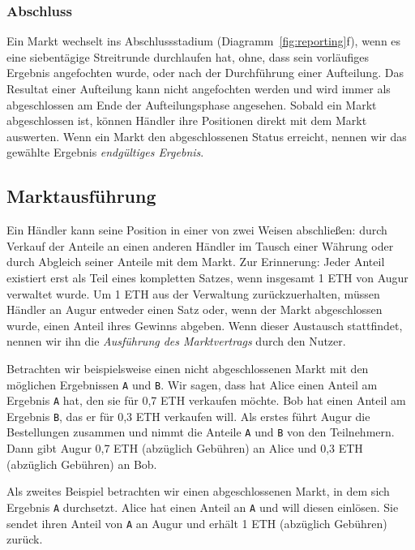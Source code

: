 \documentclass[floatfix,reprint,nofootinbib,amsmath,amssymb,epsfig,pre,floats,letterpaper,groupedaffiliation]{revtex4-1}
\theoremstyle{definition}
\theoremstyle{definition}
\theoremstyle{definition}
\begin{document}
\subsubsection{Abschluss}

Ein Markt wechselt ins Abschlussstadium (Diagramm~\ref{fig:reporting}f), wenn es eine siebentägige Streitrunde durchlaufen hat, ohne, dass sein vorläufiges Ergebnis angefochten wurde, oder nach der Durchführung einer Aufteilung. Das Resultat einer Aufteilung kann nicht angefochten werden und wird immer als abgeschlossen am Ende der Aufteilungsphase angesehen. Sobald ein Markt abgeschlossen ist, können Händler ihre Positionen direkt mit dem Markt auswerten. Wenn ein Markt den abgeschlossenen Status erreicht, nennen wir das gewählte Ergebnis \textit{endgültiges Ergebnis}.

\subsection{Marktausführung}\label{section:settlement}

Ein Händler kann seine Position in einer von zwei Weisen abschließen: durch Verkauf der Anteile an einen anderen Händler im Tausch einer Währung oder durch Abgleich seiner Anteile mit dem Markt. Zur Erinnerung: Jeder Anteil existiert erst als Teil eines kompletten Satzes, wenn insgesamt 1 ETH von Augur verwaltet wurde. Um 1 ETH aus der Verwaltung zurückzuerhalten, müssen Händler an Augur entweder einen Satz oder, wenn der Markt abgeschlossen wurde, einen Anteil ihres Gewinns abgeben. Wenn dieser Austausch stattfindet, nennen wir ihn die \textit{Ausführung des Marktvertrags} durch den Nutzer.

Betrachten wir beispielsweise einen nicht abgeschlossenen Markt mit den möglichen Ergebnissen \texttt{A} und \texttt{B}. Wir sagen, dass hat Alice einen Anteil am Ergebnis \texttt{A} hat, den sie für 0,7 ETH verkaufen möchte. Bob hat einen Anteil am Ergebnis \texttt{B}, das er für 0,3 ETH verkaufen will. Als erstes führt Augur die Bestellungen zusammen und nimmt die Anteile \texttt{A} und \texttt{B} von den Teilnehmern. Dann gibt Augur 0,7 ETH (abzüglich Gebühren) an Alice und 0,3 ETH (abzüglich Gebühren) an Bob.

Als zweites Beispiel betrachten wir einen abgeschlossenen Markt, in dem sich Ergebnis \texttt{A} durchsetzt. Alice hat einen Anteil an \texttt{A} und will diesen einlösen. Sie sendet ihren Anteil von \texttt{A} an Augur und erhält 1 ETH (abzüglich Gebühren) zurück.
\end{document}
